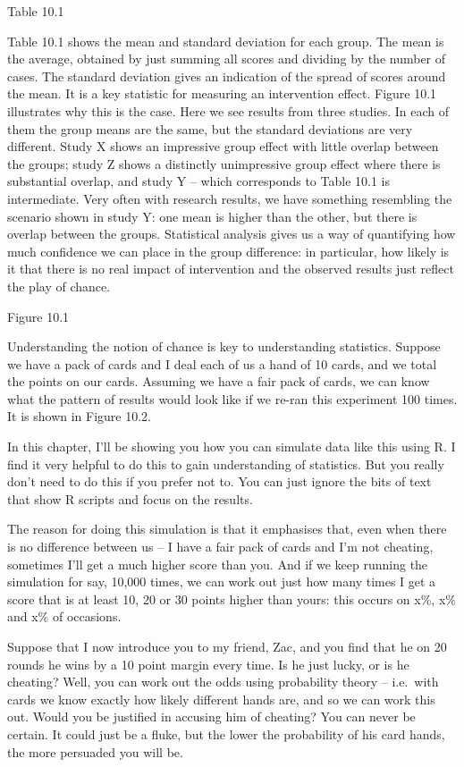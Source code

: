 \documentclass[]{book}
\begin{document}
Table 10.1

Table 10.1 shows the mean and standard deviation for each group. The mean is the average, obtained by just summing all scores and dividing by the number of cases. The standard deviation gives an indication of the spread of scores around the mean. It is a key statistic for measuring an intervention effect. Figure 10.1 illustrates why this is the case. Here we see results from three studies. In each of them the group means are the same, but the standard deviations are very different. Study X shows an impressive group effect with little overlap between the groups; study Z shows a distinctly unimpressive group effect where there is substantial overlap, and study Y -- which corresponds to Table 10.1 is intermediate. Very often with research results, we have something resembling the scenario shown in study Y: one mean is higher than the other, but there is overlap between the groups. Statistical analysis gives us a way of quantifying how much confidence we can place in the group difference: in particular, how likely is it that there is no real impact of intervention and the observed results just reflect the play of chance.

Figure 10.1

Understanding the notion of chance is key to understanding statistics. Suppose we have a pack of cards and I deal each of us a hand of 10 cards, and we total the points on our cards. Assuming we have a fair pack of cards, we can know what the pattern of results would look like if we re-ran this experiment 100 times. It is shown in Figure 10.2.

In this chapter, I'll be showing you how you can simulate data like this using R. I find it very helpful to do this to gain understanding of statistics. But you really don't need to do this if you prefer not to. You can just ignore the bits of text that show R scripts and focus on the results.

The reason for doing this simulation is that it emphasises that, even when there is no difference between us -- I have a fair pack of cards and I'm not cheating, sometimes I'll get a much higher score than you. And if we keep running the simulation for say, 10,000 times, we can work out just how many times I get a score that is at least 10, 20 or 30 points higher than yours: this occurs on x\%, x\% and x\% of occasions.

Suppose that I now introduce you to my friend, Zac, and you find that he on 20 rounds he wins by a 10 point margin every time. Is he just lucky, or is he cheating? Well, you can work out the odds using probability theory -- i.e.~with cards we know exactly how likely different hands are, and so we can work this out. Would you be justified in accusing him of cheating? You can never be certain. It could just be a fluke, but the lower the probability of his card hands, the more persuaded you will be.
\end{document}
